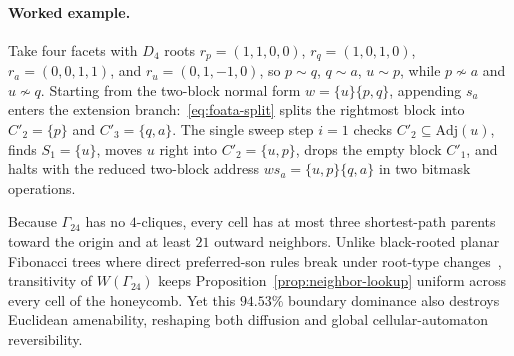 \paragraph{Worked example.}
Take four facets with $D_4$ roots $r_p = (1,1,0,0)$, $r_q = (1,0,1,0)$, $r_a = (0,0,1,1)$, and $r_u = (0,1,-1,0)$, so $p \sim q$, $q \sim a$, $u \sim p$, while $p \not\sim a$ and $u \not\sim q$. Starting from the two-block normal form $w = \{u\}\{p, q\}$, appending $s_a$ enters the extension branch:~\eqref{eq:foata-split} splits the rightmost block into $C'_2 = \{p\}$ and $C'_3 = \{q, a\}$. The single sweep step $i = 1$ checks $C'_2 \subseteq \mathrm{Adj}(u)$, finds $S_1 = \{u\}$, moves $u$ right into $C'_2 = \{u, p\}$, drops the empty block $C'_1$, and halts with the reduced two-block address $w s_a = \{u, p\}\{q, a\}$ in two bitmask operations.

Because $\Gamma_{24}$ has no $4$-cliques, every cell has at most three shortest-path parents toward the origin and at least $21$ outward neighbors. Unlike black-rooted planar Fibonacci trees where direct preferred-son rules break under root-type changes~\cite{margenstern2019fib1}, transitivity of $W(\Gamma_{24})$ keeps Proposition~\ref{prop:neighbor-lookup} uniform across every cell of the honeycomb. Yet this $94.53\%$ boundary dominance also destroys Euclidean amenability, reshaping both diffusion and global cellular-automaton reversibility.
